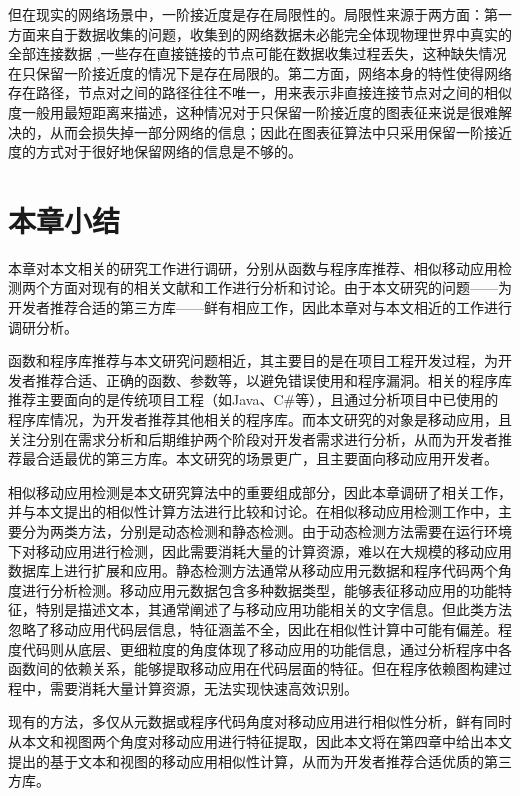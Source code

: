 但在现实的网络场景中，一阶接近度是存在局限性的。局限性来源于两方面：第一方面来自于数据收集的问题，收集到的网络数据未必能完全体现物理世界中真实的全部连接数据\cite{liben2007link} ,一些存在直接链接的节点可能在数据收集过程丢失，这种缺失情况在只保留一阶接近度的情况下是存在局限的。第二方面，网络本身的特性使得网络存在路径，节点对之间的路径往往不唯一，用来表示非直接连接节点对之间的相似度一般用最短距离来描述，这种情况对于只保留一阶接近度的图表征来说是很难解决的，从而会损失掉一部分网络的信息；因此在图表征算法中只采用保留一阶接近度的方式对于很好地保留网络的信息是不够的。





\section{本章小结}
本章对本文相关的研究工作进行调研，分别从函数与程序库推荐、相似移动应用检测两个方面对现有的相关文献和工作进行分析和讨论。由于本文研究的问题——为开发者推荐合适的第三方库——鲜有相应工作，因此本章对与本文相近的工作进行调研分析。

函数和程序库推荐与本文研究问题相近，其主要目的是在项目工程开发过程，为开发者推荐合适、正确的函数、参数等，以避免错误使用和程序漏洞。相关的程序库推荐主要面向的是传统项目工程（如Java、C\#等），且通过分析项目中已使用的程序库情况，为开发者推荐其他相关的程序库。而本文研究的对象是移动应用，且关注分别在需求分析和后期维护两个阶段对开发者需求进行分析，从而为开发者推荐最合适最优的第三方库。本文研究的场景更广，且主要面向移动应用开发者。

相似移动应用检测是本文研究算法中的重要组成部分，因此本章调研了相关工作，并与本文提出的相似性计算方法进行比较和讨论。在相似移动应用检测工作中，主要分为两类方法，分别是动态检测和静态检测。由于动态检测方法需要在运行环境下对移动应用进行检测，因此需要消耗大量的计算资源，难以在大规模的移动应用数据库上进行扩展和应用。静态检测方法通常从移动应用元数据和程序代码两个角度进行分析检测。移动应用元数据包含多种数据类型，能够表征移动应用的功能特征，特别是描述文本，其通常阐述了与移动应用功能相关的文字信息。但此类方法忽略了移动应用代码层信息，特征涵盖不全，因此在相似性计算中可能有偏差。程度代码则从底层、更细粒度的角度体现了移动应用的功能信息，通过分析程序中各函数间的依赖关系，能够提取移动应用在代码层面的特征。但在程序依赖图构建过程中，需要消耗大量计算资源，无法实现快速高效识别。

现有的方法，多仅从元数据或程序代码角度对移动应用进行相似性分析，鲜有同时从本文和视图两个角度对移动应用进行特征提取，因此本文将在第四章中给出本文提出的基于文本和视图的移动应用相似性计算，从而为开发者推荐合适优质的第三方库。




	